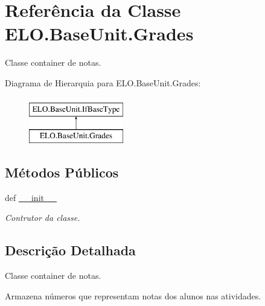 \hypertarget{classELO_1_1BaseUnit_1_1Grades}{\section{Referência da Classe E\-L\-O.\-Base\-Unit.\-Grades}
\label{classELO_1_1BaseUnit_1_1Grades}
}


Classe container de notas.  


Diagrama de Hierarquia para E\-L\-O.\-Base\-Unit.\-Grades\-:\begin{figure}[H]
\begin{center}
\leavevmode
\includegraphics[height=2.000000cm]{dc/d3a/classELO_1_1BaseUnit_1_1Grades}
\end{center}
\end{figure}
\subsection*{Métodos Públicos}
\begin{DoxyCompactItemize}
\item 
def \hyperlink{classELO_1_1BaseUnit_1_1Grades_af948e06e9c08a7d99da82eae5f851839}{\-\_\-\-\_\-init\-\_\-\-\_\-}
\begin{DoxyCompactList}\small\item\em Contrutor da classe. \end{DoxyCompactList}\end{DoxyCompactItemize}


\subsection{Descrição Detalhada}
Classe container de notas. 

Armazena números que representam notas dos alunos nas atividades. 

